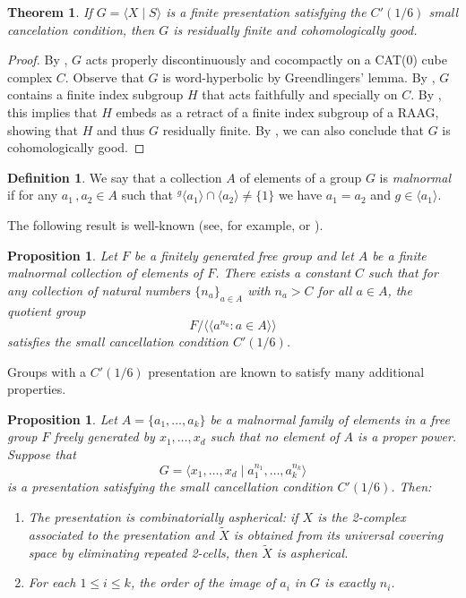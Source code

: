 \documentclass[a4paper]{amsart}
\newtheorem{teo}[lem]{Theorem}
\newtheorem{pro}[lem]{Proposition}
\theoremstyle{definition}
\newtheorem{defn}[lem]{Definition}
\theoremstyle{remark}
\begin{document}
\begin{teo}\label{c16} If \(G =  \langle X \mid S \rangle\) is a finite presentation satisfying the \(C'(1/6)\) small cancelation condition, then \(G\) is residually finite and cohomologically good.
\end{teo}
\begin{proof} By \cite[Thm. 1]{Wi04}, \(G\) acts properly discontinuously and cocompactly on a CAT(0) cube complex \(C\). Observe that \(G\) is word-hyperbolic by Greendlingers' lemma. By \cite[Thm. 1.1]{Ag13}, \(G\) contains a finite index subgroup \(H\) that acts faithfully and specially on \(C\). By \cite[Sec. 6]{Haglund2007}, this implies that \(H\) embeds as a retract of a finite index subgroup of a RAAG, showing that \(H\) and thus \(G\) residually finite. By \cite[Prop. 3.8]{MZ}, we can also conclude that \(G\) is cohomologically good.
\end{proof}

\begin{defn} We say that a collection \(A\) of elements of a group \(G\) is \emph{malnormal} if for any \(a_1\,, a_2 \in A\) such that \({^g\langle a_1 \rangle} \cap \langle a_2 \rangle \neq \{1\}\) we have \(a_1 = a_2\) and \(g \in \langle a_1 \rangle\).
\end{defn}

 The following result is well-known (see, for example, \cite[Thm. 9.10]{Wi12} or \cite[Lem. 5.11]{AM24}).
  
\begin{pro}\label{bigpowers} Let \(F\) be a finitely generated free group and let \(A\) be a finite malnormal collection of elements of \(F\). There exists a constant \(C\) such that for any collection of natural numbers \(\{n_a\}_{a\in A}\) with \(n_a > C\) for all \(a \in A\), the quotient group \[
F/\langle\!\langle a^{n_a} \colon a \in A \rangle\!\rangle\]
satisfies the small cancellation condition \(C'(1/6)\).
\end{pro}

Groups with a \(C'(1/6)\) presentation are known to satisfy many additional properties.

\begin{pro}\label{small} Let \(A = \{a_1, \ldots, a_k\}\) be a malnormal family of elements in a free group \(F\) freely generated by \(x_1,\ldots, x_d\) such that no element of \(A\) is a proper power. Suppose that \[G = \langle x_1,\ldots, x_d \mid a_1^{n_1}, \ldots, a_k^{n_k} \rangle\] is a presentation satisfying the small cancellation condition \(C'(1/6)\). Then:
\begin{enumerate}
    \item \cite[Cor. 2.5]{Ly66} The presentation is combinatorially aspherical: if \(X\) is the 2-complex associated to the presentation and \(\widetilde{X}\) is obtained from its universal covering space by eliminating repeated 2-cells, then \(\widetilde{X}\) is aspherical.
    \item \cite[Thm. 25]{St88} For each \(1 \leq i \leq k\), the order of the image of \(a_i\) in \(G\) is exactly \(n_i\).
\end{enumerate}
\end{pro}
\end{document}
